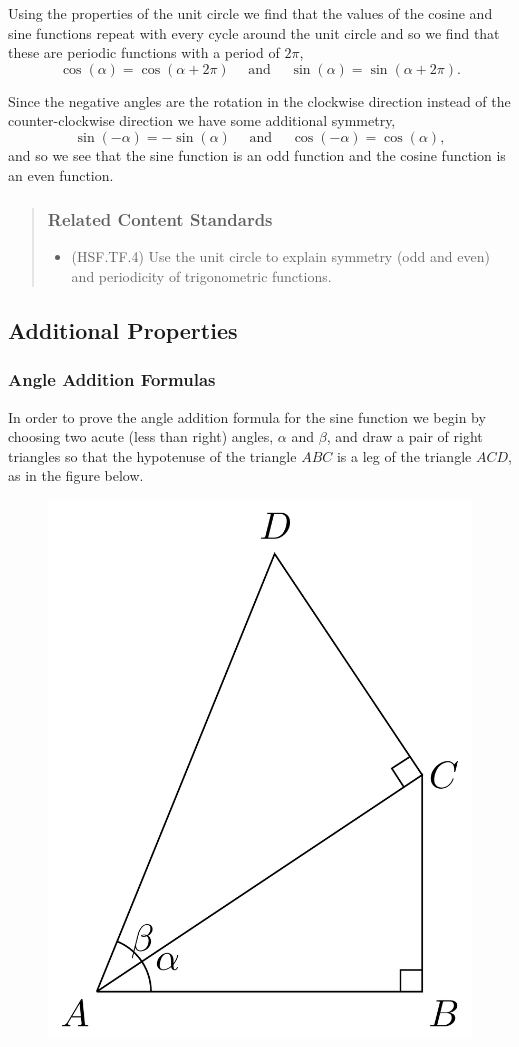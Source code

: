 \documentclass[
]{book}
\providecommand{\tightlist}{%
  \setlength{\itemsep}{0pt}\setlength{\parskip}{0pt}}
\theoremstyle{definition}
\theoremstyle{definition}
\theoremstyle{definition}
\theoremstyle{remark}
\begin{document}
Using the properties of the unit circle we find that the values of the cosine and sine functions repeat with every cycle around the unit circle and so we find that these are periodic functions with a period of \(2\pi\),
\[\cos(\alpha) = \cos (\alpha+2\pi) \quad \mbox{ and } \quad \sin(\alpha) = \sin(\alpha+2\pi).\]

Since the negative angles are the rotation in the clockwise direction instead of the counter-clockwise direction we have some additional symmetry,
\[\sin(-\alpha)=-\sin(\alpha) \quad \mbox{ and } \quad \cos(-\alpha) = \cos(\alpha),\]
and so we see that the sine function is an odd function and the cosine function is an even function.

\begin{quote}
\hypertarget{related-content-standards-57}{%
\subsubsection*{Related Content Standards}\label{related-content-standards-57}}

\begin{itemize}
\tightlist
\item
  (HSF.TF.4) Use the unit circle to explain symmetry (odd and even) and periodicity of trigonometric functions.
\end{itemize}
\end{quote}

\hypertarget{additional-properties}{%
\subsection{Additional Properties}\label{additional-properties}}

\hypertarget{angle-addition-formulas}{%
\subsubsection{Angle Addition Formulas}\label{angle-addition-formulas}}

In order to prove the angle addition formula for the sine function we begin by choosing two acute (less than right) angles, \(\alpha\) and \(\beta\), and draw a pair of right triangles so that the hypotenuse of the triangle \(ABC\) is a leg of the triangle \(ACD\), as in the figure below.

\begin{figure}

{\centering \includegraphics[width=0.3\linewidth]{tikz/angle-addition-sine1} 

}

\end{figure}
\end{document}
